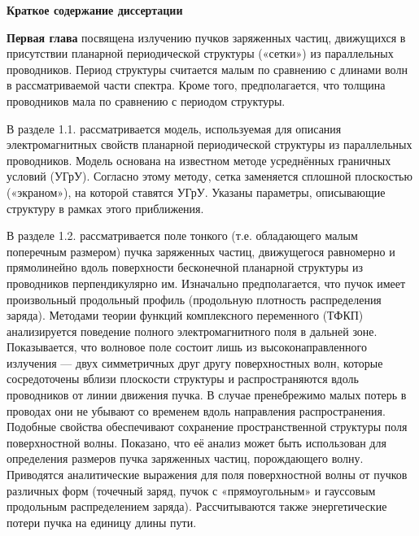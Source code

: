 \hfill

\textbf{Краткое содержание диссертации}

\textbf{Первая глава} посвящена излучению пучков заряженных частиц, движущихся в присутствии планарной периодической структуры («сетки») из параллельных проводников. Период структуры считается малым по сравнению с длинами волн в рассматриваемой части спектра. Кроме того, предполагается, что толщина проводников мала по сравнению с периодом структуры.

В разделе 1.1. рассматривается модель, используемая для описания электромагнитных свойств планарной периодической структуры из параллельных проводников. Модель основана на известном методе усреднённых граничных условий (УГрУ). Согласно этому методу, сетка заменяется сплошной плоскостью («экраном»), на которой ставятся УГрУ. Указаны параметры, описывающие структуру в рамках этого приближения.

В разделе 1.2. рассматривается поле тонкого (т.е. обладающего малым поперечным размером) пучка заряженных частиц, движущегося равномерно и прямолинейно вдоль поверхности бесконечной планарной структуры из проводников перпендикулярно им. Изначально предполагается, что пучок имеет произвольный продольный профиль (продольную плотность распределения заряда). Методами теории функций комплексного переменного (ТФКП) анализируется поведение полного электромагнитного поля в дальней зоне. Показывается, что волновое поле состоит лишь из высоконаправленного излучения — двух симметричных друг другу поверхностных волн, которые сосредоточены вблизи плоскости структуры и распространяются вдоль проводников от линии движения пучка. В случае пренебрежимо малых потерь в проводах они не убывают со временем вдоль направления распространения. Подобные свойства обеспечивают сохранение пространственной структуры поля поверхностной волны. Показано, что её анализ может быть использован для определения размеров пучка заряженных частиц, порождающего волну. Приводятся аналитические выражения для поля поверхностной волны от пучков различных форм (точечный заряд, пучок с «прямоугольным» и гауссовым продольным распределением заряда). Рассчитываются также энергетические потери пучка на единицу длины пути.

